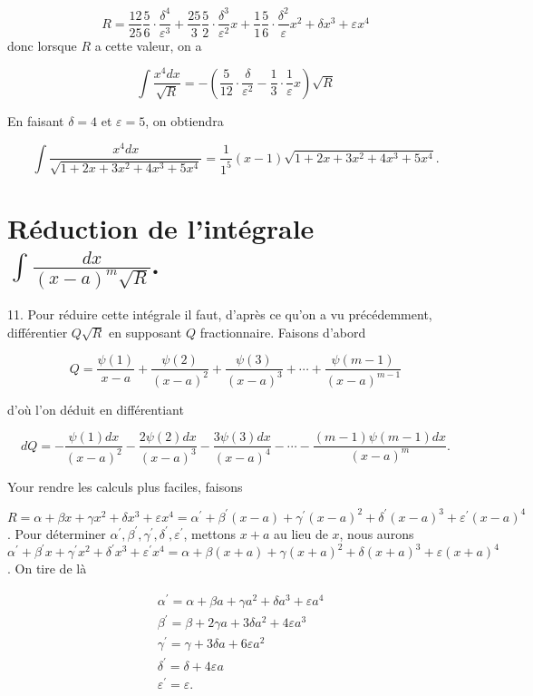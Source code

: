 \documentclass{article}
\begin{document}
\[
R=\frac{12}{25} \frac{5}{6} \cdot \frac{\delta^{4}}{\varepsilon^{3}}+\frac{25}{3} \frac{5}{2} \cdot \frac{\delta^{3}}{\varepsilon^{2}} x+\frac{1}{1} \frac{5}{6} \cdot \frac{\delta^{2}}{\varepsilon} x^{2}+\delta x^{3}+\varepsilon x^{4}
\]
donc lorsque \(R\) a cette valeur, on a

\[
\int \frac{x^{4} d x}{\sqrt{R}}=-\left(\frac{5}{12} \cdot \frac{\delta}{\varepsilon^{2}}-\frac{1}{3} \cdot \frac{1}{\varepsilon} x\right) \sqrt{R}
\]

En faisant \(\delta=4\) et \(\varepsilon=5\), on obtiendra

\[
\int \frac{x^{4} d x}{\sqrt{1+2 x+3 x^{2}+4 x^{3}+5 x^{4}}}=\frac{1}{1^{5}}(x-1) \sqrt{1+2 x+3 x^{2}+4 x^{3}+5 x^{4}} .
\]

\section*{Réduction de l'intégrale \(\int \frac{d x}{(x-a)^{m} \sqrt{R}}\).}

11. Pour réduire cette intégrale il faut, d'après ce qu'on a vu précédemment, différentier \(Q \sqrt{R}\) en supposant \(Q\) fractionnaire. Faisons d'abord

\[
Q=\frac{\psi(1)}{x-a}+\frac{\psi(2)}{(x-a)^{2}}+\frac{\psi(3)}{(x-a)^{3}}+\cdots+\frac{\psi(m-1)}{(x-a)^{m-1}}
\]

d'où l'on déduit en différentiant

\[
d Q=-\frac{\psi(1) d x}{(x-a)^{2}}-\frac{2 \psi(2) d x}{(x-a)^{3}}-\frac{3 \psi(3) d x}{(x-a)^{4}}-\cdots-\frac{(m-1) \psi(m-1) d x}{(x-a)^{m}} .
\]

Your rendre les calculs plus faciles, faisons

\(R=\alpha+\beta x+\gamma x^{2}+\delta x^{3}+\varepsilon x^{4}=\alpha^{\prime}+\beta^{\prime}(x-a)+\gamma^{\prime}(x-a)^{2}+\delta^{\prime}(x-a)^{3}+\varepsilon^{\prime}(x-a)^{4}\). Pour déterminer \(\alpha^{\prime}, \beta^{\prime}, \gamma^{\prime}, \delta^{\prime}, \varepsilon^{\prime}\), mettons \(x+a\) au lieu de \(x\), nous aurons \(\alpha^{\prime}+\beta^{\prime} x+\gamma^{\prime} x^{2}+\delta^{\prime} x^{3}+\varepsilon^{\prime} x^{4}=\alpha+\beta(x+a)+\gamma(x+a)^{2}+\delta(x+a)^{3}+\varepsilon(x+a)^{4}\). On tire de là

\[
\begin{aligned}
& \alpha^{\prime}=\alpha+\beta a+\gamma a^{2}+\delta a^{3}+\varepsilon a^{4} \\
& \beta^{\prime}=\beta+2 \gamma a+3 \delta a^{2}+4 \varepsilon a^{3} \\
& \gamma^{\prime}=\gamma+3 \delta a+6 \varepsilon a^{2} \\
& \delta^{\prime}=\delta+4 \varepsilon a \\
& \varepsilon^{\prime}=\varepsilon .
\end{aligned}
\]
\end{document}
